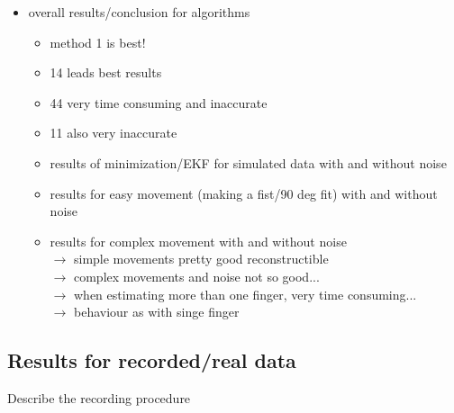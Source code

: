 \begin{itemize}
\item overall results/conclusion for algorithms
	\begin{itemize}
	\item method 1 is best!
	\item 14 leads best results
	\item 44 very time consuming and inaccurate
	\item 11 also very inaccurate
	\end{itemize}	
		
\begin{itemize}
\item results of minimization/EKF for simulated data with and without noise
\item results for easy movement (making a fist/90 deg fit) with and without noise
\item results for complex movement with and without noise \\
		$ \rightarrow $ simple movements pretty good reconstructible\\
		$ \rightarrow $	complex movements and noise not so good...\\
		$ \rightarrow $ when estimating more than one finger, very time consuming...\\
		$ \rightarrow $	behaviour as with singe finger
\end{itemize}

\end{itemize}



\subsection{Results for recorded/real data} \label{subsec:resMeas}

Describe the recording procedure

